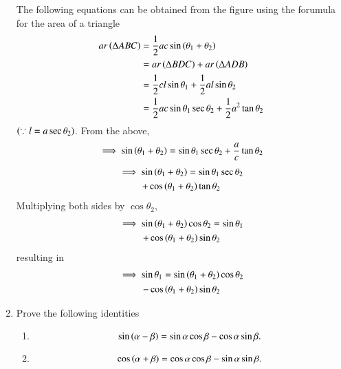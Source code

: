 \begin{enumerate}[label=\arabic*.,ref=\thesubsection.\theenumi]
\solution The following equations can be obtained from the figure using the forumula for the area of a triangle
%
\begin{align}
ar \left(\Delta ABC\right) &= \frac{1}{2}ac \sin\left(\theta_1 + \theta_2\right) \\
&= ar \left(\Delta BDC\right) + ar \left(\Delta ADB\right) \\
&= \frac{1}{2}cl \sin{\theta_1} + \frac{1}{2}al \sin{\theta_2} \\ 
&= \frac{1}{2}ac \sin{\theta_1} \sec \theta_2 + \frac{1}{2}a^2 \tan{\theta_2} 
\end{align}
$\left(\because
	l = a \sec \theta_2\right)$.  From the above,
\begin{align}
\implies \sin\left(\theta_1 + \theta_2\right) &=  \sin{\theta_1} \sec \theta_2 + \frac{a}{c} \tan{\theta_2} \\
\end{align}
\begin{multline}
\implies \sin\left(\theta_1 + \theta_2\right) =  \sin{\theta_1} \sec \theta_2 
\\
+ \cos\left(\theta_1 + \theta_2\right) \tan{\theta_2} 
\end{multline}
Multiplying both sides by $\cos \theta_2$,
\begin{multline}
\implies \sin\left(\theta_1 + \theta_2\right)\cos{\theta_2} =  \sin{\theta_1}  
\\
+ \cos\left(\theta_1 + \theta_2\right) \sin\theta_2  
\end{multline}
%
resulting in
\begin{multline}
\implies \sin \theta_1 = \sin\left(\theta_1 + \theta_2\right)\cos{\theta_2} 
\\
- \cos\left(\theta_1 + \theta_2\right) \sin\theta_2 
\end{multline}
\item
	Prove the following identities 
	\begin{enumerate}
\item 
\begin{equation}
		\label{trig_id_sin_diff}
\sin\left(\alpha - \beta\right) = \sin \alpha \cos \beta - \cos \alpha \sin \beta.
\end{equation}
\item 
\begin{equation}
\cos\left(\alpha + \beta\right) = \cos \alpha \cos \beta - \sin \alpha \sin \beta.
		\label{trig_id_cos_diff}
\end{equation}

	\end{enumerate}


\end{enumerate}
